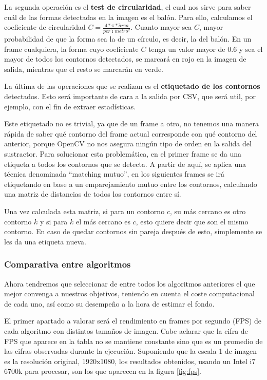 La segunda operación es el \textbf{test de circularidad}, el cual nos sirve para saber cuál de las formas detectadas en la imagen es el balón. Para ello, calculamos el coeficiente de circularidad $C =  \frac{4*\pi*\acute{a}rea}{per\acute{\imath}metro^2}$. Cuanto mayor sea $C$, mayor probabilidad de que la forma sea la de un círculo, es decir, la del balón. En un frame cualquiera, la forma cuyo coeficiente $C$ tenga un valor mayor de 0.6 y sea el mayor de todos los contornos detectados, se marcará en rojo en la imagen de salida, mientras que el resto se marcarán en verde.

La última de las operaciones que se realizan es el \textbf{etiquetado de los contornos} detectados. Esto será importante de cara a la salida por CSV, que será util, por ejemplo, con el fin de extraer estadísticas.

Este etiquetado no es trivial, ya que de un frame a otro, no tenemos una manera rápida de saber qué contorno del frame actual corresponde con qué contorno del anterior, porque OpenCV no nos asegura ningún tipo de orden en la salida del sustractor. Para solucionar esta problemática, en el primer frame se da una etiqueta a todos los contornos que se detecta. A partir de aquí, se aplica una técnica denominada ``matching mutuo'', en los siguientes frames se irá etiquetando en base a un emparejamiento mutuo entre los contornos, calculando una matriz de distancias de todos los contornos entre sí. 

Una vez calculada esta matriz, si para un contorno $c$, su más cercano es otro contorno $k$ y si para $k$ el más cercano es $c$, esto quiere decir que son el mismo contorno. En caso de quedar contornos sin pareja después de esto, simplemente se les da una etiqueta nueva.

\subsubsection*{Comparativa entre algoritmos}

Ahora tendremos que seleccionar de entre todos los algoritmos anteriores el que mejor convenga a nuestros objetivos, teniendo en cuenta el coste computacional de cada uno, así como su desempeño a la hora de estimar el fondo.

El primer apartado a valorar será el rendimiento en frames por segundo (FPS) de cada algoritmo con distintos tamaños de imagen. Cabe aclarar que la cifra de FPS que aparece en la tabla no se mantiene constante sino que es un promedio de las cifras observadas durante la ejecución. Suponiendo que la escala 1 de imagen es la resolución original, 1920x1080, los resultados obtenidos, usando un Intel i7 6700k para procesar, son los que aparecen en la figura \ref{fig:fps}.

